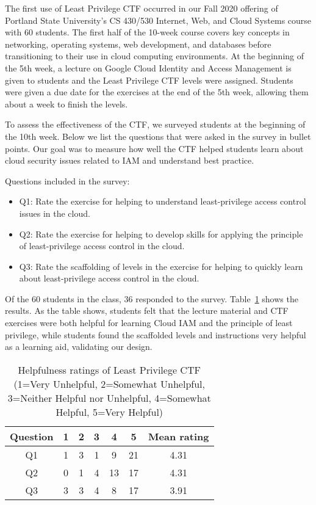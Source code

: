 The first use of Least Privilege CTF occurred in our Fall 2020 offering of Portland State University's CS 430/530 Internet, Web, and Cloud Systems course with 60 students.  The first half of the 10-week course covers key concepts in networking, operating systems, web development, and databases before transitioning to their use in cloud computing environments. At the beginning of the 5th week, a lecture on Google Cloud Identity and Access Management is given to students and the Least Privilege CTF levels were assigned. Students were given a due date for the exercises at the end of the 5th week, allowing them about a week to finish the levels.

To assess the effectiveness of the CTF, we surveyed students at the beginning of the 10th week. Below we list the questions that were asked in the survey in bullet points.  Our goal was to measure how well the CTF helped students learn about cloud security issues related to IAM and understand best practice.  

Questions included in the survey:
\begin{itemize}
\item Q1: Rate the exercise for helping to understand least-privilege access control issues in the cloud.
\item Q2: Rate the exercise for helping to develop skills for applying the principle of least-privilege access control in the cloud.
\item Q3: Rate the scaffolding of levels in the exercise for helping to quickly learn about least-privilege access control in the cloud.
\end{itemize}

Of the 60 students in the class, 36 responded to the survey.  Table~\ref{table:data} shows the results. As the table shows, students felt that the lecture material and CTF exercises were both helpful for learning Cloud IAM and the principle of least privilege, while students found the scaffolded levels and instructions very helpful as a learning aid, validating our design.

\begin{table}[h]
 \vspace{-0.20cm}
 \caption{Helpfulness ratings of Least Privilege CTF (1=Very Unhelpful, 2=Somewhat Unhelpful, 3=Neither Helpful nor Unhelpful, 4=Somewhat Helpful, 5=Very Helpful)}
    \label{table:data} \centering
    \begin{tabular}{|c|c|c|c|c|c|c|}
    \hline
    Question & 1 & 2 & 3 & 4 & 5 &Mean rating\\
    \hline
    \hline
    Q1 & 1 & 3 & 1 & 9 & 21 & 4.31\\ %
    \hline
    Q2 & 0 & 1 & 4 & 13 & 17 & 4.31\\ %
    \hline
    Q3 & 3 & 3 & 4 & 8 & 17 & 3.91\\ %
    \hline
    \end{tabular}
\end{table}